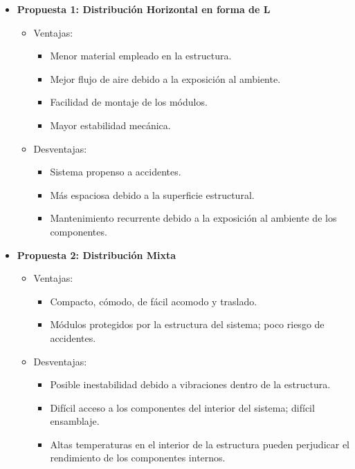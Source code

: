 \documentclass[14pt,oneside]{extarticle} %
\begin{document}
\begin{itemize}
    \item \textbf{Propuesta 1: Distribución Horizontal en forma de L}
    \begin{itemize}
        \item Ventajas:
        \begin{itemize}
            \item Menor material empleado en la estructura.
            \item Mejor flujo de aire debido a la exposición al ambiente.
            \item Facilidad de montaje de los módulos.
            \item Mayor estabilidad mecánica.
        \end{itemize}
        \item Desventajas:
        \begin{itemize}
            \item Sistema propenso a accidentes.
            \item Más espaciosa debido a la superficie estructural.
            \item Mantenimiento recurrente debido a la exposición al ambiente de los componentes.
        \end{itemize}
    \end{itemize}
    
    \item \textbf{Propuesta 2: Distribución Mixta}
    \begin{itemize}
        \item Ventajas:
        \begin{itemize}
            \item Compacto, cómodo, de fácil acomodo y traslado.
            \item Módulos protegidos por la estructura del sistema; poco riesgo de accidentes.
        \end{itemize}
        \item Desventajas:
        \begin{itemize}
            \item Posible inestabilidad debido a vibraciones dentro de la estructura.
            \item Difícil acceso a los componentes del interior del sistema; difícil ensamblaje.
            \item Altas temperaturas en el interior de la estructura pueden perjudicar el rendimiento de los componentes internos.
        \end{itemize}
    \end{itemize}


\end{itemize}
\end{document}
